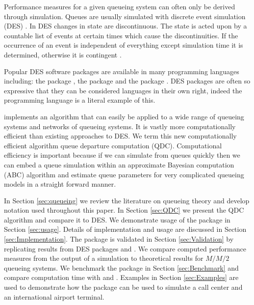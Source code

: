 \documentclass[article]{jss}
\begin{document}
Performance measures for a given queueing system can often only be derived through simulation. Queues are usually simulated with discrete event simulation (DES) \citep[pg. 226]{insua2012bayesian}. In DES changes in state are discontinuous. The state is acted upon by a countable list of events at certain times which cause the discontinuities. If the occurrence of an event is independent of everything except simulation time it is determined, otherwise it is contingent \citep{nance1981time}. 

Popular DES software packages are available in many programming languages including: the  package  \citep{Rpkg_simmer}, the  \citep{van2011python} package  \citep{Ppkg_simpy} and the   \citep{gosling2000java} package  \citep{Jpkg_JMT}. DES packages are often so expressive that they can be considered languages in their own right, indeed the programming language  \citep{dahl1966simula} is a literal example of this. 

 \citep{Rpkg_queuecomputer} implements an algorithm that can easily be applied to a wide range of queueing systems and networks of queueing systems. It is vastly more computationally efficient than existing approaches to DES. We term this new computationally efficient algorithm queue departure computation (QDC). Computational efficiency is important because if we can simulate from queues quickly then we can embed a queue simulation within an approximate Bayesian computation (ABC) algorithm \citep{sunnaker_approximate_2013} and estimate queue parameters for very complicated queueing models in a straight forward manner. 

In Section \ref{sec:queueing} we review the literature on queueing theory and develop notation used throughout this paper. In Section \ref{sec:QDC} we present the QDC algorithm and compare it to DES. We demonstrate usage of the package in Section \ref{sec:usage}. Details of implementation and usage are discussed in Section \ref{sec:Implementation}. The package is validated in Section \ref{sec:Validation} by replicating results from DES packages  and . We compare computed performance measures from the output of a  simulation to theoretical results for $M/M/2$ queueing systems. We benchmark the package in Section \ref{sec:Benchmark} and compare computation time with  and . Examples in Section \ref{sec:Examples} are used to demonstrate how the package can be used to simulate a call center and an international airport terminal. 
\end{document}
